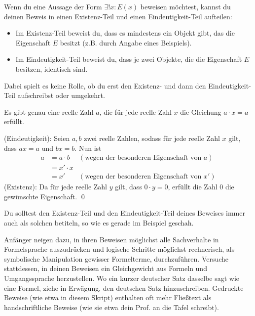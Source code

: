 \begin{satz} \label{eindbeweis} 
    Wenn du eine Aussage der Form $\exists ! x: E(x)$ beweisen möchtest, kannst du deinen Beweis in einen Existenz-Teil und einen Eindeutigkeit-Teil aufteilen:
    \begin{itemize}
        \item Im Existenz-Teil beweist du, dass es mindestens ein Objekt gibt, das die Eigenschaft $E$ besitzt (z.B. durch Angabe eines Beispiels).
        \item Im Eindeutigkeit-Teil beweist du, dass je zwei Objekte, die die Eigenschaft $E$ besitzen, identisch sind.
    \end{itemize}
    Dabei spielt es keine Rolle, ob du erst den Existenz- und dann den Eindeutigkeit-Teil aufschreibst oder umgekehrt.
\end{satz}


\begin{bsp} \label{bsp:eindbeweis}
    Es gibt genau eine reelle Zahl $a$, die für jede reelle Zahl $x$ die Gleichung $a\cdot x=a$ erfüllt.
\end{bsp}


\begin{bew}
    (Eindeutigkeit): Seien $a,b$ zwei reelle Zahlen, sodass für jede reelle Zahl $x$ gilt, dass $ax=a$ und $bx=b$. Nun ist
    \begin{align*}
        a & = a\cdot b & (\text{wegen der besonderen Eigenschaft von $a$}) \\
        & = x' \cdot x  \\
        & = x' & (\text{wegen der besonderen Eigenschaft von $x'$})
    \end{align*}
    (Existenz): Da für jede reelle Zahl $y$ gilt, dass $0\cdot y=0$, erfüllt die Zahl $0$ die gewünschte Eigenschaft. \qed
\end{bew}


\begin{bem}[Signalwörter]
    Du solltest den Existenz-Teil und den Eindeutigkeit-Teil deines Beweises immer auch als solchen betiteln, so wie es gerade im Beispiel geschah.
\end{bem}


\begin{bem}
    Anfänger neigen dazu, in ihren Beweisen möglichst alle Sachverhalte in Formelsprache auszudrücken und logische Schritte möglichst rechnerisch, als symbolische Manipulation gewisser Formelterme, durchzuführen. Versuche stattdessen, in deinen Beweisen ein Gleichgewicht aus Formeln und Umgangssprache herzustellen. Wo ein kurzer deutscher Satz dasselbe sagt wie eine Formel, ziehe in Erwägung, den deutschen Satz hinzuschreiben. Gedruckte Beweise (wie etwa in diesem Skript) enthalten oft mehr Fließtext als handschriftliche Beweise (wie sie etwa dein Prof. an die Tafel schreibt).
\end{bem}





